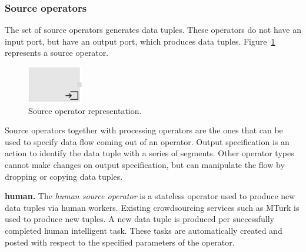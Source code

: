 \subsubsection{Source operators}
The set of source operators generates data tuples. These operators do not have 
an input port, but have an output port, which produces data tuples. Figure~\ref{fig:source operator} 
represents a source operator.

\begin{figure}[ht]
	\centering
	\includegraphics[height=60px]{figures/SourceOperator.pdf}
	\caption{Source operator representation.}
	\label{fig:source operator}
\end{figure}

Source operators together with processing operators are the ones that can be 
used to specify data flow coming out of an operator. Output specification is an 
action to identify the data tuple with a series of segments. Other operator types 
cannot make changes on output specification, but can manipulate the flow by dropping 
or copying data tuples.

\textbf{human.} 
The \textit{human source operator} is a stateless operator used to produce new data tuples 
via human workers. Existing crowdsourcing services such as MTurk is used 
to produce new tuples. A new data tuple is produced per successfully completed 
human intelligent task. These tasks are automatically created and posted with 
respect to the specified parameters of the operator.

